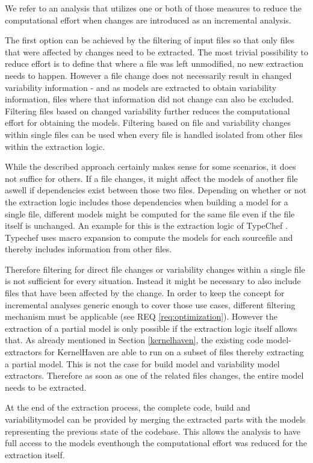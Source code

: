 \documentclass[a4paper]{article}
\begin{document}
We refer to an analysis that utilizes one or both of those measures to reduce the computational effort when changes are introduced as an incremental analysis.

The first option can be achieved by the filtering of input files so that only files that were affected by changes need to be extracted. The most trivial possibility to reduce effort is to define that where a file was left unmodified, no new extraction needs to happen. 
However a file change does not necessarily result in changed variability information - and as models are extracted to obtain variability information, files where that information did not change can also be excluded. Filtering files based on changed variability further reduces the computational effort for obtaining the models. Filtering based on file and variability changes within single files can be used when every file is handled isolated from other files within the extraction logic.

While the described approach certainly makes sense for some scenarios, it does not suffice for others. If a file changes, it might affect the models of another file aswell if dependencies exist between those two files. Depending on whether or not the extraction logic includes those dependencies when building a model for a single file, different models might be computed for the same file even if the file itself is unchanged. An example for this is the extraction logic of TypeChef \cite{Kenner:2010:TTT:1868688.1868693}. Typechef uses macro expansion to compute the models for each sourcefile and thereby includes information from other files. 

Therefore filtering for direct file changes or variability changes within a single file is not sufficient for every situation. Instead it might be necessary to also include files that have been affected by the change. In order to keep the concept for incremental analyses generic enough to cover those use cases, different filtering mechanism must be applicable (see REQ \ref{req:optimization}). However the extraction of a partial model is only possible if the extraction logic itself allows that. As already mentioned in Section \ref{kernelhaven}, the existing code model-extractors for KernelHaven  are able to run on a subset of files thereby extracting a partial model.  This is not the case for build model and variability model extractors. Therefore as soon as one of the related files changes, the entire model needs to be extracted.  

At the end of the extraction process, the complete code, build and variabilitymodel can be provided by merging the extracted parts with the models representing the previous state of the codebase. This allows the analysis to have full access to the models eventhough the computational effort was reduced for the extraction itself.
\end{document}
